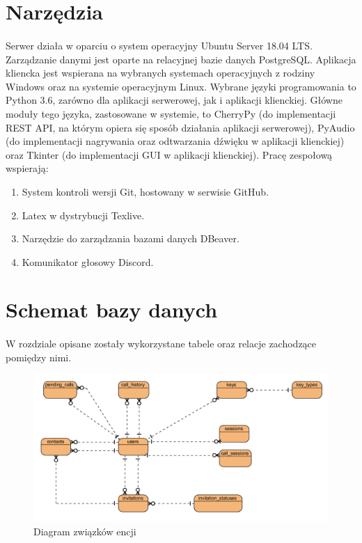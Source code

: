 \documentclass{article}
\begin{document}
  \section{Narzędzia}
  \paragraph{}Serwer działa w oparciu o system operacyjny Ubuntu Server 18.04 LTS. Zarządzanie danymi jest oparte na relacyjnej bazie danych PostgreSQL. Aplikacja kliencka jest wspierana na wybranych systemach operacyjnych z rodziny Windows oraz na systemie operacyjnym Linux. Wybrane języki programowania to Python 3.6, zarówno dla aplikacji serwerowej, jak i aplikacji klienckiej. Główne moduły tego języka, zastosowane w systemie, to CherryPy (do implementacji REST API, na którym opiera się sposób działania aplikacji serwerowej), PyAudio (do implementacji nagrywania oraz odtwarzania dźwięku w aplikacji klienckiej) oraz Tkinter (do implementacji GUI w aplikacji klienckiej).
  Pracę zespołową wspierają:
  \begin{enumerate}
    \item System kontroli wersji Git, hostowany w serwisie GitHub.
    \item Latex w dystrybucji Texlive.
    \item Narzędzie do zarządzania bazami danych DBeaver.
    \item Komunikator głosowy Discord.
  \end{enumerate}
  \section{Schemat bazy danych}
  \paragraph{} W rozdziale opisane zostały wykorzystane tabele oraz relacje zachodzące pomiędzy nimi.
    \begin{figure}[H]
      \centering
        \includegraphics[width=1.0\linewidth]{assets/erd.png}
        \caption[]{Diagram związków encji}
        \label{fig:er}
    \end{figure}
\end{document}
